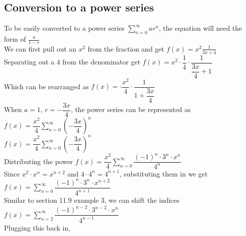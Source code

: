 \documentclass{article}
\begin{document}
\subsection*{Conversion to a power series}
To be easily converted to a power series $ \sum_{n=0}^{\infty}ar^n$, the equation will need the form of $ \frac{a}{1-r}$
\\[0.1in] We can first pull out an $ x^2$ from the fraction and get $ f(x) = x^2 \frac{1}{3x+4}$
\\[0.1in] Separating out a $ 4$ from the denominator get $ f(x) = x^2 \cdot \dfrac{1}{4} \cdot \dfrac{1}{\dfrac{3x}{4}+1}$ 
\\ Which can be rearranged as $ f(x) =  \cdot \dfrac{x^2}{4} \cdot \dfrac{1}{1+ \dfrac{3x}{4}}$
\\[0.05in] When $a=1$, $r =  - \dfrac{3x}{4}$, the power series can be represented as $ f(x) = \dfrac{x^2}{4}  \sum_{n=0}^{\infty}\left(-\dfrac{3x}{4}\right)^n$
\\[0.05in] $ f(x) = \dfrac{x^2}{4}  \sum_{n=0}^{\infty}\left(-\dfrac{3x}{4}\right)^n$
\\[0.05in] Distributing the power $ f(x) = \dfrac{x^2}{4}  \sum_{n=0}^{\infty}\dfrac{(-1)^n\cdot3^n\cdot x^n}{4^n}$
\\[0.05in] Since $x^2\cdot x^n = x^{n+2}$ and $4 \cdot 4^n = 4^{n+1}$, substituting them in we get $ f(x) =   \sum_{n=0}^{\infty}\dfrac{(-1)^n\cdot3^n\cdot x^{n+2}}{4^{n+1}}$
\\[0.05in] Similar to section 11.9 example 3, we can shift the indices $ f(x) =   \sum_{n=2}^{\infty}\dfrac{(-1)^{n-2}\cdot3^{n-2}\cdot x^{n}}{4^{n-1}}$
\\[0.05in] Plugging this back in, 
\end{document}

